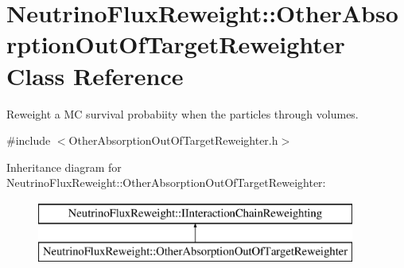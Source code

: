 \hypertarget{class_neutrino_flux_reweight_1_1_other_absorption_out_of_target_reweighter}{\section{Neutrino\-Flux\-Reweight\-:\-:Other\-Absorption\-Out\-Of\-Target\-Reweighter Class Reference}
\label{class_neutrino_flux_reweight_1_1_other_absorption_out_of_target_reweighter}
}


Reweight a M\-C survival probabiity when the particles through volumes.  




{\ttfamily \#include $<$Other\-Absorption\-Out\-Of\-Target\-Reweighter.\-h$>$}

Inheritance diagram for Neutrino\-Flux\-Reweight\-:\-:Other\-Absorption\-Out\-Of\-Target\-Reweighter\-:\begin{figure}[H]
\begin{center}
\leavevmode
\includegraphics[height=2.000000cm]{class_neutrino_flux_reweight_1_1_other_absorption_out_of_target_reweighter}
\end{center}
\end{figure}
